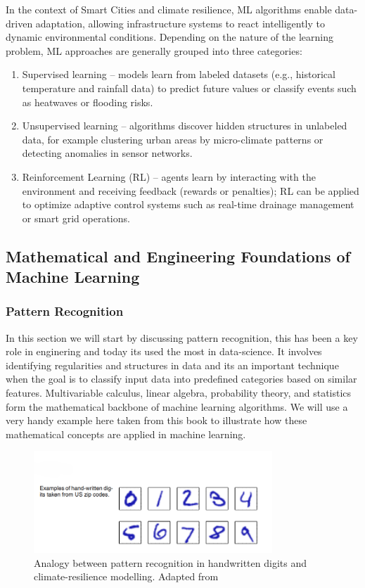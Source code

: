 \documentclass[12pt]{article}
\begin{document}
In the context of Smart Cities and climate resilience, ML algorithms enable data-driven adaptation, allowing infrastructure 
systems to react intelligently to dynamic environmental conditions. Depending on the nature of the learning problem, 
ML approaches are generally grouped into three categories:
\begin{enumerate}
    \item Supervised learning -- models learn from labeled datasets (e.g., historical temperature and rainfall data) to 
    predict future values or classify events such as heatwaves or flooding risks.
    \item Unsupervised learning -- algorithms discover hidden structures in unlabeled data, for example clustering 
    urban areas by micro-climate patterns or detecting anomalies in sensor networks.
    \item Reinforcement Learning (RL) -- agents learn by interacting with the environment and receiving 
    feedback (rewards or penalties); RL can be applied to optimize adaptive control systems such as real-time 
    drainage management or smart grid operations.
\end{enumerate}
\subsection{Mathematical and Engineering Foundations of Machine Learning}
\subsubsection{Pattern Recognition}
In this section we will start by discussing pattern recognition, this has been a key role in enginering and today its used the most in data-science. 
It involves identifying regularities and structures in data and its an important technique when the goal is to classify input data into predefined categories based on similar features.
Multivariable calculus, linear algebra, probability theory, and statistics form the mathematical backbone of machine learning algorithms.\cite{bishop2006pattern}
We will use a very handy example here taken from this book \cite{bishop2006pattern} to illustrate how these mathematical concepts are applied in machine learning.

\begin{figure}[h]
    \centering
    \includegraphics[width=0.8\textwidth]{images/Machine_learning_pixel.png}
    \caption{Analogy between pattern recognition in handwritten digits and climate-resilience modelling. Adapted from \cite{bishop2006pattern}}
    \label{fig:ml_example}
\end{figure}
\end{document}
